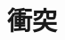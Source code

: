 \documentclass[../../all/physics-standard_questions_all.tex]{subfiles}
\begin{document}
\section{衝突}
\end{document}
